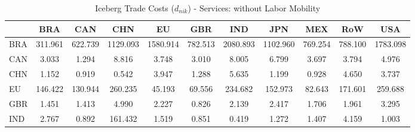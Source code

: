 \begin{table}[htbp]
\centering
\caption{Iceberg Trade Costs ($d_{nik}$) - Services: without Labor Mobility} 
\label{tab:iceberg_Services}
\begin{tabular}{lcccccccccc}
  \hline
 & BRA & CAN & CHN & EU & GBR & IND & JPN & MEX & RoW & USA \\ 
  \hline
BRA & \textcolor[RGB]{23,15,232}{311.961} & \textcolor[RGB]{20,13,235}{622.739} & \textcolor[RGB]{8,5,247}{1129.093} & \textcolor[RGB]{5,3,250}{1580.914} & \textcolor[RGB]{15,10,240}{782.513} & \textcolor[RGB]{0,0,255}{2080.893} & \textcolor[RGB]{10,7,245}{1102.960} & \textcolor[RGB]{18,12,237}{769.254} & \textcolor[RGB]{13,8,242}{788.100} & \textcolor[RGB]{3,2,252}{1783.098} \\ 
  CAN & \textcolor[RGB]{125,81,130}{3.033} & \textcolor[RGB]{196,127,59}{1.294} & \textcolor[RGB]{79,51,176}{8.816} & \textcolor[RGB]{107,69,148}{3.748} & \textcolor[RGB]{128,82,128}{3.010} & \textcolor[RGB]{82,53,173}{8.005} & \textcolor[RGB]{84,54,171}{6.799} & \textcolor[RGB]{112,73,143}{3.697} & \textcolor[RGB]{102,66,153}{3.794} & \textcolor[RGB]{92,59,163}{4.976} \\ 
  CHN & \textcolor[RGB]{212,137,43}{1.152} & \textcolor[RGB]{230,148,26}{0.919} & \textcolor[RGB]{250,162,5}{0.542} & \textcolor[RGB]{99,64,156}{3.947} & \textcolor[RGB]{199,129,56}{1.288} & \textcolor[RGB]{87,56,168}{5.635} & \textcolor[RGB]{209,135,46}{1.199} & \textcolor[RGB]{224,145,31}{0.928} & \textcolor[RGB]{94,61,161}{4.650} & \textcolor[RGB]{110,71,145}{3.737} \\ 
  EU & \textcolor[RGB]{59,38,196}{146.422} & \textcolor[RGB]{64,41,191}{130.944} & \textcolor[RGB]{31,20,224}{260.235} & \textcolor[RGB]{77,50,178}{45.193} & \textcolor[RGB]{74,48,181}{69.556} & \textcolor[RGB]{38,25,217}{234.682} & \textcolor[RGB]{54,35,201}{152.973} & \textcolor[RGB]{71,46,184}{82.643} & \textcolor[RGB]{46,30,209}{171.601} & \textcolor[RGB]{33,21,222}{259.688} \\ 
  GBR & \textcolor[RGB]{178,115,76}{1.451} & \textcolor[RGB]{184,119,71}{1.413} & \textcolor[RGB]{89,58,166}{4.990} & \textcolor[RGB]{145,94,110}{2.227} & \textcolor[RGB]{242,157,13}{0.826} & \textcolor[RGB]{148,96,107}{2.139} & \textcolor[RGB]{140,91,115}{2.417} & \textcolor[RGB]{168,109,87}{1.706} & \textcolor[RGB]{153,99,102}{1.961} & \textcolor[RGB]{117,76,138}{3.295} \\ 
  IND & \textcolor[RGB]{133,86,122}{2.767} & \textcolor[RGB]{237,153,18}{0.892} & \textcolor[RGB]{51,33,204}{161.432} & \textcolor[RGB]{171,111,84}{1.519} & \textcolor[RGB]{240,155,15}{0.851} & \textcolor[RGB]{252,163,3}{0.419} & \textcolor[RGB]{204,132,51}{1.272} & \textcolor[RGB]{186,120,69}{1.407} & \textcolor[RGB]{97,63,158}{4.159} & \textcolor[RGB]{217,140,38}{1.003} \\ 

\end{tabular}
\end{table}

